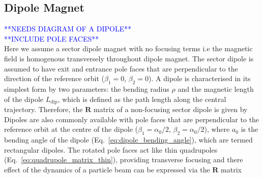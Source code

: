 \documentclass[../main.tex]{subfiles}
\begin{document}
\subsection{Dipole Magnet}

\textcolor{blue}{**NEEDS DIAGRAM OF A DIPOLE** \\ **INCLUDE POLE FACES**\\}
Here we assume a sector dipole magnet with no focusing terms i.e the magnetic field is homogenous transversely throughout dipole magnet. The sector dipole is assumed to have exit and entrance pole faces that are perpendicular to the direction of the reference orbit ($\beta_{1}=0$, $\beta_{2}=0$). A dipole is characterised in its simplest form by two parameters: the bending radius $\rho$ and the magnetic length of the dipole $L_{\mathrm{dip}}$, which is defined as the path length along the central trajectory. Therefore, the $\boldsymbol{R}$ matrix of a non-focusing sector dipole is given by 
Dipoles are also commonly available with pole faces that are perpendicular to the reference orbit at the centre of the dipole ($\beta_{1}=\alpha_{0}/2$, $\beta_{2}=\alpha_{0}/2$), where $a_{0}$ is the bending angle of the dipole (Eq.~\ref{eq:dipole_bending_angle}), which are termed rectangular dipoles. The rotated pole faces act like thin quadrupoles (Eq.~\ref{eq:quadrupole_matrix_thin}), providing transverse focusing and there effect of the dynamics of a particle beam can be expressed via the $\boldsymbol{R}$ matrix
\end{document}
